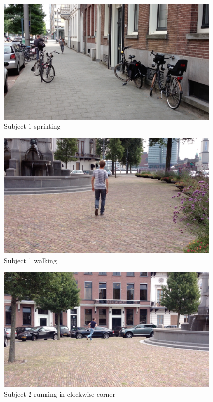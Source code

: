 \begin{figure}
\centering
  \includegraphics[width=1\textwidth]{./Figures/chapter6/data_collection/stills/jos sprint.png}
  \caption[Recording still 4]{Subject 1 sprinting}
\end{figure}

\begin{figure}
\centering
  \includegraphics[width=1\textwidth]{./Figures/chapter6/data_collection/stills/jos walking.png}
  \caption[Recording still 5]{Subject 1 walking}
\end{figure}

\begin{figure}
\centering
  \includegraphics[width=1\textwidth]{./Figures/chapter6/data_collection/stills/roemer run cw.png}
  \caption[Recording still 6]{Subject 2 running in clockwise corner}
\end{figure}

